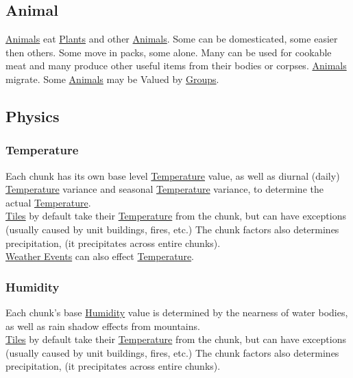 \documentclass[11pt]{article}
\begin{document}
\subsection{Animal \label{orgdadda30} \label{orgb1f888f}}
\label{sec:orged2772a}
\hyperref[orgb1f888f]{Animals} eat \hyperref[org6e70fa0]{Plants} and other \hyperref[orgb1f888f]{Animals}. Some can be domesticated, some easier then others. Some move in packs, some alone. Many can be used for cookable meat and many produce other useful items from their bodies or corpses. \hyperref[orgb1f888f]{Animals} migrate. Some \hyperref[orgb1f888f]{Animals} may be Valued by \hyperref[org21e4d88]{Groups}.\\
\subsection{Physics}
\label{sec:org99ab37b}
\subsubsection{Temperature \label{org1131659} \label{org3ec9870}}
\label{sec:org595dce1}
Each chunk has its own base level \hyperref[org1131659]{Temperature} value, as well as diurnal (daily) \hyperref[org1131659]{Temperature} variance and seasonal \hyperref[org1131659]{Temperature} variance, to determine the actual \hyperref[org1131659]{Temperature}.\\

\hyperref[org5189a7f]{Tiles} by default take their \hyperref[org1131659]{Temperature} from the chunk, but can have exceptions (usually caused by unit buildings, fires, etc.) The chunk factors also determines precipitation, (it precipitates across entire chunks).\\

\hyperref[org3b0b756]{Weather Events} can also effect \hyperref[org1131659]{Temperature}.\\
\subsubsection{Humidity \label{org1479080} \label{orgc2b2f2b}}
\label{sec:orga8bfae5}
Each chunk's base \hyperref[org1479080]{Humidity} value is determined by the nearness of water bodies, as well as rain shadow effects from mountains.\\

\hyperref[org5189a7f]{Tiles} by default take their \hyperref[org1131659]{Temperature} from the chunk, but can have exceptions (usually caused by unit buildings, fires, etc.) The chunk factors also determines precipitation, (it precipitates across entire chunks).\\
\end{document}
